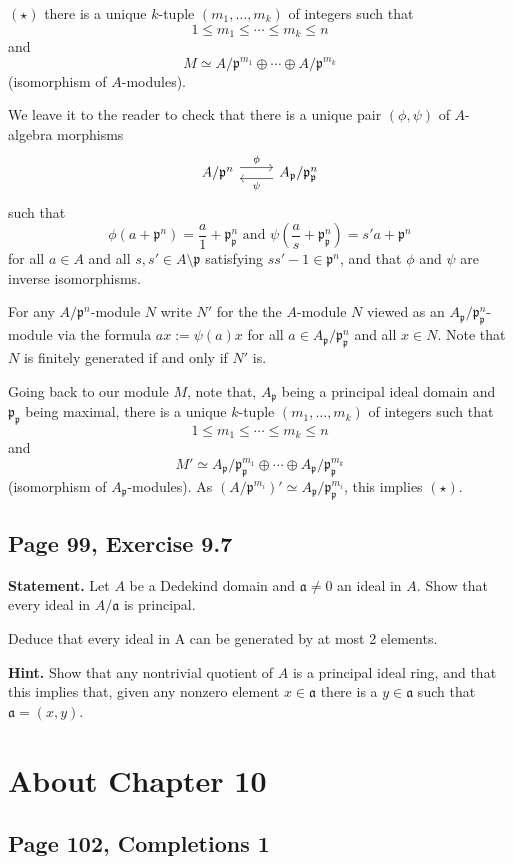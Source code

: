 \documentclass[parskip=half,fontsize=12pt]{scrartcl}%
\newcommand{\mf}{\mathfrak}
\newcommand{\aaa}{\mf a}
\newcommand{\ppp}{\mf p}
\begin{document}
$(\star)$ there is a unique $k$-tuple $(m_1,\dots,m_k)$ of integers such that 
$$
1\le m_1\le\cdots\le m_k\le n
$$ 
and 
$$
M\simeq A/\ppp^{m_1}\oplus\cdots\oplus A/\ppp^{m_k}
$$ 
(isomorphism of $A$-modules).

We leave it to the reader to check that there is a unique pair $(\phi,\psi)$ of $A$-algebra morphisms 
$$
\begin{tikzcd}
A/\ppp^n\ar[r,yshift=0.9ex,"\phi"]&A_\ppp/\ppp_\ppp^n\ar[l,yshift=-0.9ex,"\psi"]
\end{tikzcd}
$$ 
such that 
$$
\phi(a+\ppp^n)=\frac a1+\ppp_\ppp^n\text{ and }\psi\left(\frac as+\ppp_\ppp^n\right)=s'a+\ppp^n
$$ 
for all $a\in A$ and all $s,s'\in A\setminus\ppp$ satisfying $ss'-1\in\ppp^n$, and that $\phi$ and $\psi$ are inverse isomorphisms. 

For any $A/\ppp^n$-module $N$ write $N'$ for the the $A$-module $N$ viewed as an $A_\ppp/\ppp_\ppp^n$-module via the formula $ax:=\psi(a)x$ for all $a\in A_\ppp/\ppp_\ppp^n$ and all $x\in N$. Note that $N$ is finitely generated if and only if $N'$ is.  

Going back to our module $M$, note that, $A_\ppp$ being a principal ideal domain and $\ppp_\ppp$ being maximal, there is a unique $k$-tuple $(m_1,\dots,m_k)$ of integers such that 
$$
1\le m_1\le\cdots\le m_k\le n
$$ 
and 
$$
M'\simeq A_\ppp/\ppp_\ppp^{m_1}\oplus\cdots\oplus A_\ppp/\ppp_\ppp^{m_k}
$$ 
(isomorphism of $A_\ppp$-modules). As $(A/\ppp^{m_i})'\simeq A_\ppp/\ppp_\ppp^{m_i}$, this implies $(\star)$. 

\subsection{Page 99, Exercise 9.7}%

\textbf{Statement.} Let $A$ be a Dedekind domain and $\aaa\ne0$ an ideal in $A$. Show that every ideal in $A/\aaa$ is principal.

Deduce that every ideal in A can be generated by at most 2 elements. 

\textbf{Hint.} Show that any nontrivial quotient of $A$ is a principal ideal ring, and that this implies that, given any nonzero element $x\in\aaa$ there is a $y\in\aaa$ such that $\aaa=(x,y)$. 

\section{About Chapter 10}%

\subsection{Page 102, Completions 1}%
\end{document}
